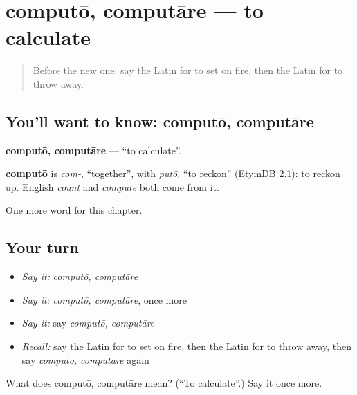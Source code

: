 \section[computō, computāre]{computō, computāre — to calculate}

\label{lesson:LA-C167-computo}



\begin{quote}
Before the new one: say the Latin for to set on fire, then the Latin for to throw away.
\end{quote}

\subsection*{You'll want to know: computō, computāre}
\textbf{computō, computāre} — \textquotedblleft{}to calculate\textquotedblright{}.

\begin{cousinweb}
\textbf{computō} is \emph{com-}, \textquotedblleft{}together\textquotedblright{}, with \emph{putō}, \textquotedblleft{}to reckon\textquotedblright{} (EtymDB 2.1): to reckon up. English \emph{count} and \emph{compute} both come from it.
\end{cousinweb}

\begin{grammarlens}[title={What you've built}]
One more word for this chapter.
\end{grammarlens}

\subsection*{Your turn}
\begin{itemize}
\raggedright
  \item \emph{Say it:} \emph{computō, computāre}
  \item \emph{Say it:} \emph{computō, computāre}, once more
  \item \emph{Say it:} say \emph{computō, computāre}
  \item \emph{Recall:} say the Latin for to set on fire, then the Latin for to throw away, then say \emph{computō, computāre} again
\end{itemize}

\begin{tcolorbox}[breakable,colback=teal!4,colframe=teal!35!black,title={Before you move on}]
What does computō, computāre mean? (\textquotedblleft{}To calculate\textquotedblright{}.) Say it once more.
\end{tcolorbox}
